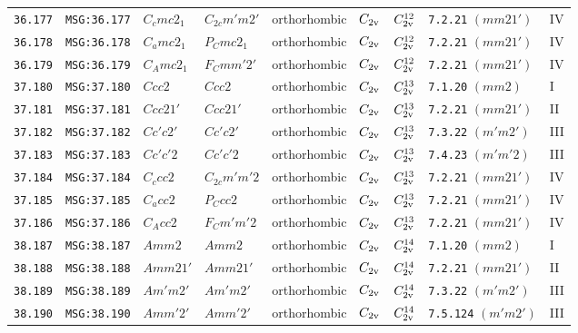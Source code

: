 \documentclass[fleqn,10pt]{jsarticle}
\begin{document}
\begin{center}
\begin{longtable}{lllllllll}
\texttt{36.177} & \texttt{MSG:36.177} & $C_{c}mc2_{1}$ & $C_{2c}m'm2'$ & orthorhombic & $C_{\rm 2v}$ & $C_{\rm 2v}^{12}$ & \texttt{7.2.21} $(mm21')$ & IV \\
\texttt{36.178} & \texttt{MSG:36.178} & $C_{a}mc2_{1}$ & $P_{C}mc2_{1}$ & orthorhombic & $C_{\rm 2v}$ & $C_{\rm 2v}^{12}$ & \texttt{7.2.21} $(mm21')$ & IV \\
\texttt{36.179} & \texttt{MSG:36.179} & $C_{A}mc2_{1}$ & $F_{C}mm'2'$ & orthorhombic & $C_{\rm 2v}$ & $C_{\rm 2v}^{12}$ & \texttt{7.2.21} $(mm21')$ & IV \\ \hline
\texttt{37.180} & \texttt{MSG:37.180} & $Ccc2$ & $Ccc2$ & orthorhombic & $C_{\rm 2v}$ & $C_{\rm 2v}^{13}$ & \texttt{7.1.20} $(mm2)$ & I \\
\texttt{37.181} & \texttt{MSG:37.181} & $Ccc21'$ & $Ccc21'$ & orthorhombic & $C_{\rm 2v}$ & $C_{\rm 2v}^{13}$ & \texttt{7.2.21} $(mm21')$ & II \\
\texttt{37.182} & \texttt{MSG:37.182} & $Cc'c2'$ & $Cc'c2'$ & orthorhombic & $C_{\rm 2v}$ & $C_{\rm 2v}^{13}$ & \texttt{7.3.22} $(m'm2')$ & III \\
\texttt{37.183} & \texttt{MSG:37.183} & $Cc'c'2$ & $Cc'c'2$ & orthorhombic & $C_{\rm 2v}$ & $C_{\rm 2v}^{13}$ & \texttt{7.4.23} $(m'm'2)$ & III \\
\texttt{37.184} & \texttt{MSG:37.184} & $C_{c}cc2$ & $C_{2c}m'm'2$ & orthorhombic & $C_{\rm 2v}$ & $C_{\rm 2v}^{13}$ & \texttt{7.2.21} $(mm21')$ & IV \\
\texttt{37.185} & \texttt{MSG:37.185} & $C_{a}cc2$ & $P_{C}cc2$ & orthorhombic & $C_{\rm 2v}$ & $C_{\rm 2v}^{13}$ & \texttt{7.2.21} $(mm21')$ & IV \\
\texttt{37.186} & \texttt{MSG:37.186} & $C_{A}cc2$ & $F_{C}m'm'2$ & orthorhombic & $C_{\rm 2v}$ & $C_{\rm 2v}^{13}$ & \texttt{7.2.21} $(mm21')$ & IV \\ \hline
\texttt{38.187} & \texttt{MSG:38.187} & $Amm2$ & $Amm2$ & orthorhombic & $C_{\rm 2v}$ & $C_{\rm 2v}^{14}$ & \texttt{7.1.20} $(mm2)$ & I \\
\texttt{38.188} & \texttt{MSG:38.188} & $Amm21'$ & $Amm21'$ & orthorhombic & $C_{\rm 2v}$ & $C_{\rm 2v}^{14}$ & \texttt{7.2.21} $(mm21')$ & II \\
\texttt{38.189} & \texttt{MSG:38.189} & $Am'm2'$ & $Am'm2'$ & orthorhombic & $C_{\rm 2v}$ & $C_{\rm 2v}^{14}$ & \texttt{7.3.22} $(m'm2')$ & III \\
\texttt{38.190} & \texttt{MSG:38.190} & $Amm'2'$ & $Amm'2'$ & orthorhombic & $C_{\rm 2v}$ & $C_{\rm 2v}^{14}$ & \texttt{7.5.124} $(m'm2')$ & III \\

\end{longtable}
\end{center}
\end{document}
